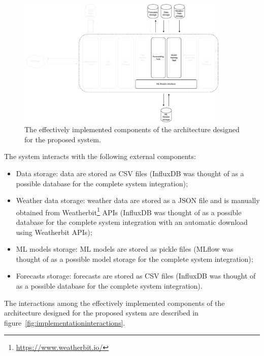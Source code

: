 \begin{figure}[H]
\centering
\includegraphics[width=0.9\textwidth]{images/implementation_components}
\caption{The effectively implemented components of the architecture designed for the proposed system.}
\label{fig:implementationcomponents}
\end{figure}

The system interacts with the following external components:
\begin{itemize}
  \item Data storage: data are stored as CSV files (InfluxDB was thought of as a possible database for the complete system integration);
  \item Weather data storage: weather data are stored as a JSON file and is manually obtained from Weatherbit\footnote{ \url{https://www.weatherbit.io/} } APIs (InfluxDB was thought of as a possible database for the complete system integration with an automatic download using Weatherbit APIs);
  \item ML models storage: ML models are stored as pickle files (MLflow was thought of as a possible model storage for the complete system integration);
  \item Forecasts storage: forecasts are stored as CSV files (InfluxDB was thought of as a possible database for the complete system integration).
\end{itemize}

The interactions among the effectively implemented components of the architecture designed for the proposed system are described in figure~\ref{fig:implementationinteractions}.

